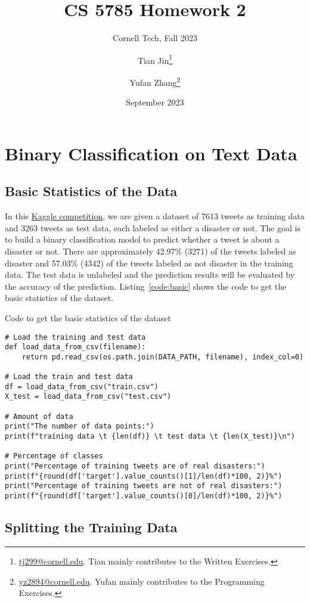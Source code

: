 \documentclass{article}
\title{CS 5785 Homework 2}
\subtitle{Cornell Tech, Fall 2023}
\author{
    Tian Jin\thanks{\href{mailto:tj299@cornell.edu}{tj299@cornell.edu}. Tian mainly contributes to the Written Exercises.}
\and{
    Yufan Zhang\thanks{\href{mailto:yz2894@cornell.edu}{yz2894@cornell.edu}. Yufan mainly contributes to the Programming Exercises.}
}}
\date{September 2023}
\begin{document}
\maketitle

\section{Binary Classification on Text Data}
\subsection{Basic Statistics of the Data}
In this \href{https://www.kaggle.com/competitions/nlp-getting-started/overview}{Kaggle competition}, we are given a dataset of 7613 tweets as training data and 3263 tweets as test data, each labeled as either a disaster or not. The goal is to build a binary classification model to predict whether a tweet is about a disaster or not. There are approximately 42.97\% (3271) of the tweets labeled as disaster and 57.03\% (4342) of the tweets labeled as not disaster in the training data. The test data is unlabeled and the prediction results will be evaluated by the accuracy of the prediction. Listing~\ref{code:basic} shows the code to get the basic statistics of the dataset.

\begin{listing}[H]
\caption{Code to get the basic statistics of the dataset}
\label{code:basic}
\begin{verbatim}
# Load the training and test data
def load_data_from_csv(filename):
    return pd.read_csv(os.path.join(DATA_PATH, filename), index_col=0)

# Load the train and test data
df = load_data_from_csv("train.csv")
X_test = load_data_from_csv("test.csv")

# Amount of data
print("The number of data points:")
print(f"training data \t {len(df)} \t test data \t {len(X_test)}\n")

# Percentage of classes
print("Percentage of training tweets are of real disasters:")
print(f"{round(df['target'].value_counts()[1]/len(df)*100, 2)}%")
print("Percentage of training tweets are not of real disasters:")
print(f"{round(df['target'].value_counts()[0]/len(df)*100, 2)}%")
\end{verbatim}
\end{listing}

\subsection{Splitting the Training Data}
\end{document}
